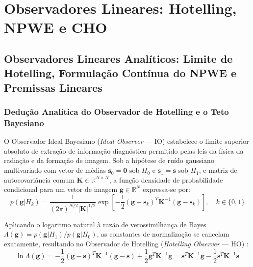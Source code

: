 \documentclass[
  12pt,
  a4paper,
  oneside
]{report}
\begin{document}
\section{Observadores Lineares: Hotelling, NPWE e CHO}
\label{sec:observadores_lineares_deducoes_completas}

\subsection{Observadores Lineares Analíticos: Limite de Hotelling, Formulação Contínua do NPWE e Premissas Lineares}
\label{subsec:observadores_lineares_analiticos_npwe_hotelling}

\subsubsection{Dedução Analítica do Observador de Hotelling e o Teto Bayesiano}
O Observador Ideal Bayesiano (\emph{Ideal Observer} --- IO) estabelece o limite superior absoluto de extração de informação diagnóstica permitido pelas leis da física da radiação e da formação de imagem. Sob a hipótese de ruído gaussiano multivariado com vetor de médias $\mathbf{s}_0 = \mathbf{0}$ sob $H_0$ e $\mathbf{s}_1 = \mathbf{s}$ sob $H_1$, e matriz de autocovariância comum $\mathbf{K} \in \mathbb{R}^{N \times N}$, a função densidade de probabilidade condicional para um vetor de imagem $\mathbf{g} \in \mathbb{R}^N$ expressa-se por:
\begin{equation}
  p(\mathbf{g}|H_k) = \frac{1}{(2\pi)^{N/2} |\mathbf{K}|^{1/2}} \exp\left[ -\frac{1}{2} (\mathbf{g} - \mathbf{s}_k)^T \mathbf{K}^{-1} (\mathbf{g} - \mathbf{s}_k) \right], \quad k \in \{0, 1\}
  \label{eq:densidade_gaussiana_vetorial}
\end{equation}

Aplicando o logaritmo natural à razão de verossimilhança de Bayes $\Lambda(\mathbf{g}) = p(\mathbf{g}|H_1)/p(\mathbf{g}|H_0)$, as constantes de normalização se cancelam exatamente, resultando no Observador de Hotelling (\emph{Hotelling Observer} --- HO) \cite{barrett_myers_2004, wagner1979}:
\begin{equation}
  \ln\Lambda(\mathbf{g}) = -\frac{1}{2} (\mathbf{g} - \mathbf{s})^T \mathbf{K}^{-1} (\mathbf{g} - \mathbf{s}) + \frac{1}{2} \mathbf{g}^T \mathbf{K}^{-1} \mathbf{g} = \mathbf{s}^T \mathbf{K}^{-1} \mathbf{g} - \frac{1}{2} \mathbf{s}^T \mathbf{K}^{-1} \mathbf{s}
  \label{eq:log_bayes_deducao}
\end{equation}
\end{document}
